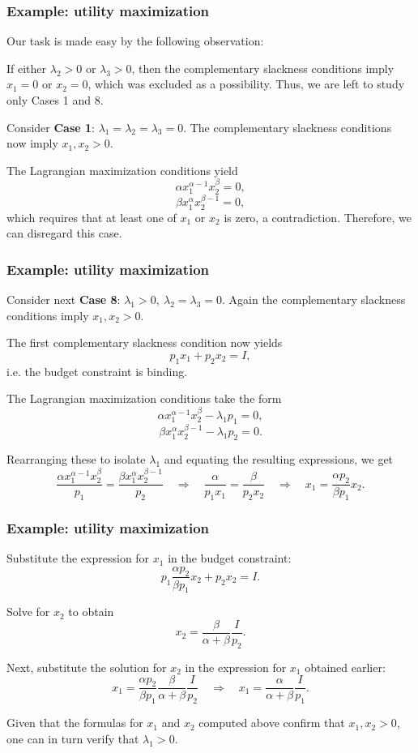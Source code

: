 \documentclass[10pt]{beamer}
\theoremstyle{definition}
\begin{document}
\begin{frame}[fragile]
\frametitle{Example: utility maximization}
Our task is made easy by the following observation:\bigskip

If either $ \lambda_2>0 $ or $ \lambda_3>0 $, then the complementary slackness conditions imply $ x_1=0 $ or $ x_2=0 $, which was excluded as a possibility. Thus, we are left to study only Cases 1 and 8.\bigskip

Consider \textbf{Case 1}: $ \lambda_1=\lambda_2=\lambda_3=0 $. The complementary slackness conditions now imply $ x_1,x_2>0 $.

The Lagrangian maximization conditions yield 
\[ \alpha x_1^{\alpha-1} x_2^\beta = 0, \]
\[ \beta x_1^\alpha x_2^{\beta-1} =0, \] which requires that at least one of $ x_1 $ or $ x_2 $ is zero, a contradiction. Therefore, we can disregard this case.
\end{frame}

\begin{frame}[fragile]
\frametitle{Example: utility maximization}
Consider next \textbf{Case 8}: $ \lambda_1>0,~\lambda_2=\lambda_3=0 $. Again the complementary slackness conditions imply $ x_1,x_2>0 $.

The first complementary slackness condition now yields \[ p_1 x_1 + p_2 x_2 = I,  \]
i.e. the budget constraint is binding.

The Lagrangian maximization conditions take the form 
\[ \alpha x_1^{\alpha-1} x_2^\beta -\lambda_1 p_1 = 0, \]
\[ \beta x_1^\alpha x_2^{\beta-1} -\lambda_1 p_2 = 0. \] 

Rearranging these to isolate $ \lambda_1 $ and equating the resulting expressions, we get
\[ \dfrac{\alpha x_1^{\alpha-1}x_2^\beta}{p_1} = \dfrac{\beta x_1^{\alpha}x_2^{\beta-1}}{p_2} \quad \Rightarrow \quad \dfrac{\alpha}{p_1 x_1} = \dfrac{\beta}{p_2 x_2} \quad \Rightarrow \quad x_1 = \dfrac{\alpha p_2}{\beta p_1}x_2. \]
\end{frame}

\begin{frame}[fragile]
\frametitle{Example: utility maximization}
Substitute the expression for $ x_1 $ in the budget constraint: 
\[ p_1 \dfrac{\alpha p_2}{\beta p_1}x_2 + p_2 x_2 = I. \]

Solve for $ x_2 $ to obtain \[ x_2 = \dfrac{\beta}{\alpha+\beta}\dfrac{I}{p_2}. \]

Next, substitute the solution for $ x_2 $ in the expression for $ x_1 $ obtained earlier:
\[ x_1 = \dfrac{\alpha p_2}{\beta p_1}\dfrac{\beta}{\alpha+\beta}\dfrac{I}{p_2} \quad \Rightarrow \quad x_1 = \dfrac{\alpha}{\alpha+\beta}\dfrac{I}{p_1}. \]\bigskip

Given that the formulas for $ x_1 $ and $ x_2 $ computed above confirm that $ x_1,x_2>0 $, one can in turn verify that $ \lambda_1 > 0 $.
\end{frame}
\end{document}
